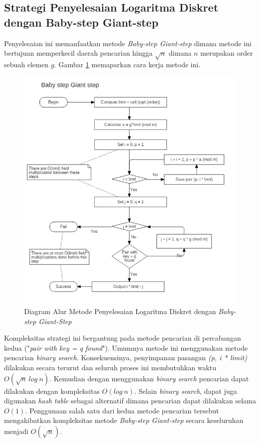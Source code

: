 \subsection {Strategi Penyelesaian Logaritma Diskret dengan Baby-step Giant-step}
Penyelesaian ini memanfaatkan metode \textit{Baby-step Giant-step} dimana metode ini bertujuan memperkecil daerah pencarian hingga $ \sqrt{n} $ dimana $ n $ merupakan order sebuah elemen $ g $. Gambar \ref{fig:bsgs} memaparkan cara kerja metode ini.

\begin{figure}
	\Centering
	\includegraphics[scale=0.44]{bab2/img/bsgs}
	\caption{Diagram Alur Metode Penyelesaian Logaritma Diskret dengan \textit{Baby-step Giant-Step}}
	\label{fig:bsgs}
\end{figure}

Kompleksitas strategi ini bergantung pada metode pencarian di percabangan kedua ("\textit{pair with key = q found}"). Umumnya metode ini menggunakan metode pencarian \textit{binary search}. Konsekuensinya, penyimpanan pasangan \textit{(p, i * limit)} dilakukan secara terurut dan seluruh proses ini membutuhkan waktu $ O(\sqrt{n}\ log\ n) $. Kemudian dengan menggunakan \textit{binary search} pencarian dapat dilakukan dengan kompleksitas $ O(log\ n) $. Selain \textit{binary search}, dapat juga digunakan \textit{hash table} sebagai alternatif dimana pencarian dapat dilakukan selama $ O(1) $. Penggunaan salah satu dari kedua metode pencarian tersebut mengakibatkan kompleksitas metode \textit{Baby-step Giant-step} secara keseluruhan menjadi $ O(\sqrt{n}) $.

